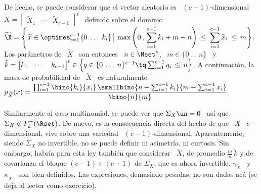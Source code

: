 De hecho, se puede considerar que el vector aleatorio es \ $(c-1)$-dimensional \
$\widetilde{X}     =    \begin{bmatrix}     \widetilde{X}_1    &     \cdots    &
  \widetilde{X}_{c-1}   \end{bmatrix}^t$   \  definido   sobre   el  dominio   \
$\displaystyle    \widetilde{\X}   =    \left\{    \left.   \widetilde{x}    \in
    \optimes_{i=1}^{c-1} \{ 0 \; \ldots \; k_i\} \, \right| \, \max\left( 0 \, ,
    \,  \sum_{i=1}^{c-1}  k_i  +  m  -  n \right)  \:  \le  \:  \sum_{i=1}^{c-1}
  \widetilde{x}_i \: \le \: m \right\}$. Los par\'ametros de \ $\widetilde{X}$ \
son  entonces \  $n \in  \Nset^*$, \  $m \in  \{  0 \;  \ldots \;  n \}$  \ y  \
$\widetilde{k}     =     \protect\begin{bmatrix}      k_1     &     \cdots     &
  k_{c-1} \end{bmatrix}^t\protect \in \left\{ q \in \{ 0 \; \ldots \; n \}^{c-1}
  \tq \sum_{i=1}^{c-1} q_i  \, \le \, n \right\}$. A  continuaci\'on, la masa de
probabilidad   de  \   $\widetilde{X}$  \   es  naturalmente   \  $\displaystyle
p_{\widetilde{X}}(x)  =  \frac{\prod_{i=1}^{c-1} \bino{k_i\vspace{1mm}}{x_i}  \,
  \smallbino{n   -   \sum_{i=1}^{c-1}   k_i\vspace{2mm}}{m  -   \sum_{i=1}^{c-1}
    x_i}}{\bino{n}{m}}$.

Similarmente al  caso multinomial, se puede ver  que $\Sigma_X \un =  0$ \ as\'i
que \ $\Sigma_X \not\in P_k^+(\Rset)$.  De nuevo, es la consecuencia directa del
hecho   de  que   \  $X$   \  $c$-dimensional,   vive  sobre   una   variedad  \
$(c-1)$-dimensional. Aparentemente, siendo $\Sigma_X$ no invertible, no se puede
definir  ni  asimetr\'ia, ni  curtosis.  Sin  embargo,  habr\'ia para  esta  ley
tambi\'en  que  considerar  \   $\widetilde{X}$,  de  promedio  $\frac{m}{n}  \,
\widetilde{k}$ y de covarianza el bloque $(c-1) \times (c-1)$ de $\Sigma_X$, que
es ahora  invertible. $\gamma_{\widetilde{X}}$ \ y  \ $\kappa_{\widetilde{X}}$ \
son bien definidos.  Las expresiones, demasiado pesadas, no  son dadas ac\'a (se
deja al lector como exercicio).


\SZ{Ver si se calcula Phi}

